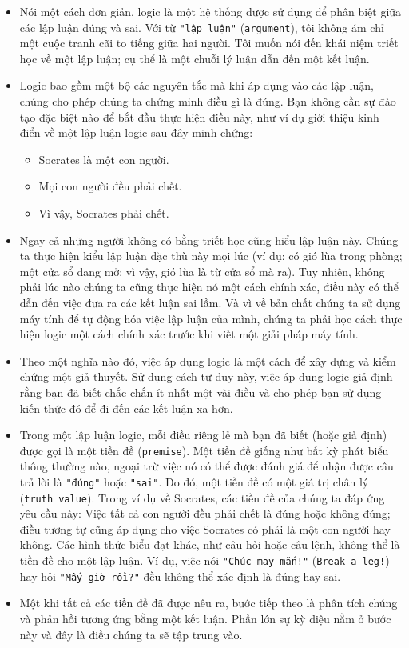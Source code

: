 \begin{itemize}
    \item Nói một cách đơn giản, logic là một hệ thống được sử dụng để phân biệt giữa các lập luận đúng và sai. Với từ \verb|"lập luận"| (\texttt{argument}), tôi không ám chỉ một cuộc tranh cãi to tiếng giữa hai người. Tôi muốn nói đến khái niệm triết học về một lập luận; cụ thể là một chuỗi lý luận dẫn đến một kết luận.

    \item Logic bao gồm một bộ các nguyên tắc mà khi áp dụng vào các lập luận, chúng cho phép chúng ta chứng minh điều gì là đúng. Bạn không cần sự đào tạo đặc biệt nào để bắt đầu thực hiện điều này, như ví dụ giới thiệu kinh điển về một lập luận logic sau đây minh chứng:
    \begin{itemize}
        \item Socrates là một con người.
        \item Mọi con người đều phải chết.
        \item Vì vậy, Socrates phải chết.
    \end{itemize}

    \item Ngay cả những người không có bằng triết học cũng hiểu lập luận này. Chúng ta thực hiện kiểu lập luận đặc thù này mọi lúc (ví dụ: có gió lùa trong phòng; một cửa sổ đang mở; vì vậy, gió lùa là từ cửa sổ mà ra). Tuy nhiên, không phải lúc nào chúng ta cũng thực hiện nó một cách chính xác, điều này có thể dẫn đến việc đưa ra các kết luận sai lầm. Và vì về bản chất chúng ta sử dụng máy tính để tự động hóa việc lập luận của mình, chúng ta phải học cách thực hiện logic một cách chính xác trước khi viết một giải pháp máy tính.

    \item Theo một nghĩa nào đó, việc áp dụng logic là một cách để xây dựng và kiểm chứng một giả thuyết. Sử dụng cách tư duy này, việc áp dụng logic giả định rằng bạn đã biết chắc chắn ít nhất một vài điều và cho phép bạn sử dụng kiến thức đó để đi đến các kết luận xa hơn.

    \item Trong một lập luận logic, mỗi điều riêng lẻ mà bạn đã biết (hoặc giả định) được gọi là một tiền đề (\texttt{premise}). Một tiền đề giống như bất kỳ phát biểu thông thường nào, ngoại trừ việc nó có thể được đánh giá để nhận được câu trả lời là \verb|"đúng"| hoặc \verb|"sai"|. Do đó, một tiền đề có một giá trị chân lý (\texttt{truth value}). Trong ví dụ về Socrates, các tiền đề của chúng ta đáp ứng yêu cầu này: Việc tất cả con người đều phải chết là đúng hoặc không đúng; điều tương tự cũng áp dụng cho việc Socrates có phải là một con người hay không. Các hình thức biểu đạt khác, như câu hỏi hoặc câu lệnh, không thể là tiền đề cho một lập luận. Ví dụ, việc nói \verb|"Chúc may mắn!"| (\verb|Break a leg!|) hay hỏi \verb|"Mấy giờ rồi?"| đều không thể xác định là đúng hay sai.

    \item Một khi tất cả các tiền đề đã được nêu ra, bước tiếp theo là phân tích chúng và phản hồi tương ứng bằng một kết luận. Phần lớn sự kỳ diệu nằm ở bước này và đây là điều chúng ta sẽ tập trung vào.
\end{itemize}

